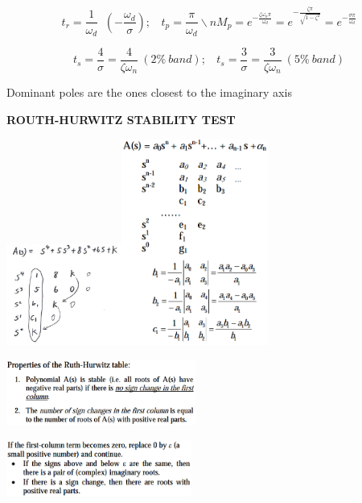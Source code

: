 \documentclass[a0,landscape]{article}
\begin{document}
\begin{multicols}{3}
\[{t_{r} = \frac{1}{\omega_{d}}\operatorname{}\left( - \frac{\omega_{d}}{\sigma} \right);\ \ \ \ t_{p} = \frac{\pi}{\omega_{d}}\backslash n}{M_{p} = e^{- \frac{\zeta\omega_{n}\pi}{\omega_{d}}} = e^{- \frac{\zeta \pi}{\sqrt{1 - \zeta^{2}}}} = e^{- \frac{\sigma \pi}{\omega_{d}}}}\]

\[t_{s} = \frac{4}{\sigma} = \frac{4}{\zeta\omega_{n}}\ \left( 2\%\ band \right);\ \ \ \ t_{s} = \frac{3}{\sigma} = \frac{3}{\zeta\omega_{n}}\ \left( 5\%\ band \right)\]

Dominant poles are the ones closest to the imaginary axis

\textbf{ROUTH-HURWITZ STABILITY TEST}

\includegraphics[width=1.48466in,height=1.31009in]{media/image11.png}\includegraphics[width=1.91031in,height=2.66258in]{media/image12.png}

\includegraphics[width=2.44785in,height=0.83792in]{media/image13.png}

\includegraphics[width=2.39877in,height=0.72842in]{media/image14.png}


\end{multicols}
\end{document}
